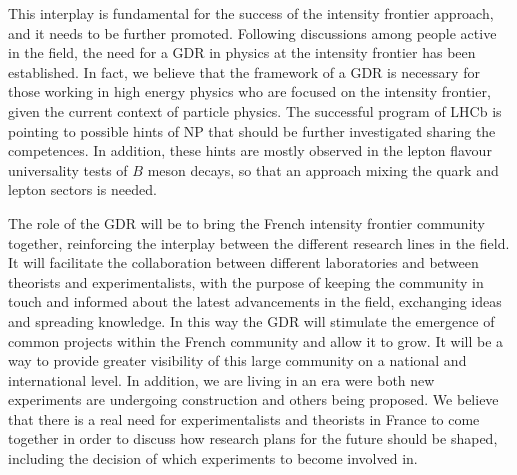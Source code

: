 

This interplay is fundamental for the success of the intensity frontier approach, and it needs to be further promoted. 
Following discussions among people active in the field, the need for a GDR in physics at the intensity frontier has been established. In fact, we believe that the framework of a GDR is necessary for those working in high energy physics who are focused on the intensity frontier, given the current context of particle physics. The successful program of LHCb is pointing to possible hints of NP that should be further investigated sharing the competences. In addition, these hints are mostly observed in the lepton flavour universality tests of $B$ meson decays, so that an approach mixing the quark and lepton sectors is needed. 

 The role of the GDR will be  to bring the French intensity frontier community together,  reinforcing the interplay between the different research lines in the field. It will facilitate the collaboration between different laboratories and between theorists and experimentalists, with the purpose of keeping the community in touch and informed about the latest advancements in the field, exchanging ideas and spreading knowledge. In this way the GDR will stimulate the emergence of common projects within the French community and allow it to grow. It will be a way to provide greater visibility of this large community on a national and international level. In addition,  we are living in an era were both new experiments are undergoing construction and others being proposed. We believe that there is a real need for experimentalists and theorists in France to come together in order to discuss how research plans for the future should be shaped, including the decision of which experiments to become involved in.



